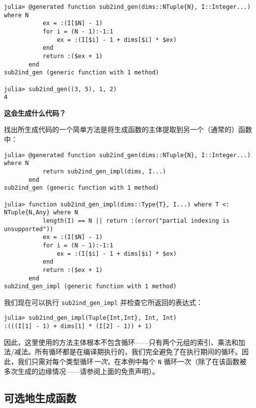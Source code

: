 \begin{verbatim}
julia> @generated function sub2ind_gen(dims::NTuple{N}, I::Integer...) where N
           ex = :(I[$N] - 1)
           for i = (N - 1):-1:1
               ex = :(I[$i] - 1 + dims[$i] * $ex)
           end
           return :($ex + 1)
       end
sub2ind_gen (generic function with 1 method)

julia> sub2ind_gen((3, 5), 1, 2)
4
\end{verbatim}



\textbf{这会生成什么代码？}



找出所生成代码的一个简单方法是将生成函数的主体提取到另一个（通常的）函数中：




\begin{verbatim}
julia> @generated function sub2ind_gen(dims::NTuple{N}, I::Integer...) where N
           return sub2ind_gen_impl(dims, I...)
       end
sub2ind_gen (generic function with 1 method)

julia> function sub2ind_gen_impl(dims::Type{T}, I...) where T <: NTuple{N,Any} where N
           length(I) == N || return :(error("partial indexing is unsupported"))
           ex = :(I[$N] - 1)
           for i = (N - 1):-1:1
               ex = :(I[$i] - 1 + dims[$i] * $ex)
           end
           return :($ex + 1)
       end
sub2ind_gen_impl (generic function with 1 method)
\end{verbatim}



我们现在可以执行 \texttt{sub2ind\_gen\_impl} 并检查它所返回的表达式：




\begin{verbatim}
julia> sub2ind_gen_impl(Tuple{Int,Int}, Int, Int)
:(((I[1] - 1) + dims[1] * (I[2] - 1)) + 1)
\end{verbatim}



因此，这里使用的方法主体根本不包含循环——只有两个元组的索引、乘法和加法/减法。所有循环都是在编译期执行的，我们完全避免了在执行期间的循环。因此，我们只需对每个类型循环\emph{一次}，在本例中每个 \texttt{N} 循环一次（除了在该函数被多次生成的边缘情况——请参阅上面的免责声明）。



\hypertarget{2054450996027567500}{}


\subsection{可选地生成函数}



